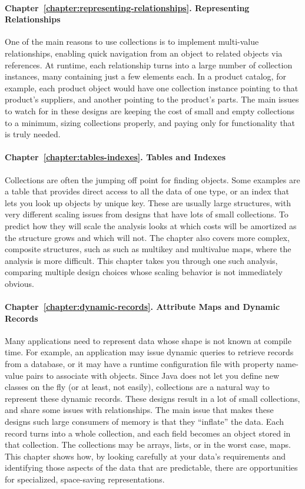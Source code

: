 \paragraph{Chapter~\ref{chapter:representing-relationships}. Representing
Relationships} One of the main reasons to use collections is to implement
multi-value relationships, enabling quick navigation from an object
to related objects via references. At runtime, each relationship turns into a
large number of collection instances, many containing just a few elements each.
In a product catalog, for example, each product object would have one collection
instance pointing to that product's suppliers, and another pointing to the product's
parts. The main issues to watch for in these designs
are keeping the cost of small and empty collections to a minimum, sizing
collections properly, and paying only for functionality that is truly needed.

\paragraph{Chapter~\ref{chapter:tables-indexes}. Tables and Indexes} Collections
are often the jumping off point for finding objects. Some
examples are a table that provides direct access to all the data of one
type, or an index that lets you look up objects by unique key.
These are usually large structures, with very different scaling issues
from designs that have lots of small collections. To
predict how they will scale the analysis looks at
which costs will be amortized as the structure grows and which will not. The chapter also covers more complex,
composite structures, such as such as multikey and multivalue maps, where the analysis is more difficult. This chapter takes you through one such analysis,
comparing multiple design choices whose scaling behavior is not immediately obvious.

\paragraph{Chapter~\ref{chapter:dynamic-records}. Attribute Maps and Dynamic
Records} Many applications need to represent data whose shape is not
known at compile time. For example, an application may issue dynamic
queries to retrieve records from a database, or it may have
a runtime configuration file with property name-value pairs to 
associate with objects. Since Java does not let you define new classes on the
fly (or at least, not easily), collections are a natural way to
represent these dynamic records. These designs result in a lot of small collections, and share some
issues with relationships. The main issue that makes these designs such large
consumers of memory is that they ``inflate'' the data. Each record turns
into a whole collection, and each field becomes an object stored in that
collection. The collections may be arrays, lists, or in the worst case, maps. This chapter shows how, by looking carefully at your data's requirements and identifying those aspects of the data
that are predictable, there are opportunities for specialized,
space-saving representations.

